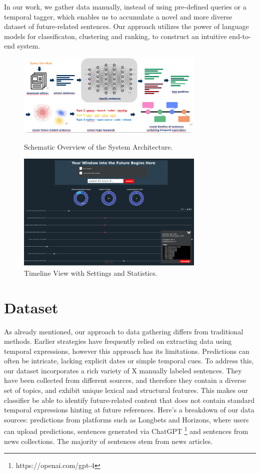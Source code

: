 \documentclass[10pt,twocolumn]{article}
\begin{document}
In our work, we gather data manually, instead of using pre-defined queries or a temporal tagger, which enables us to accumulate a novel and more diverse dataset of future-related sentences. Our approach utilizes the power of language models for classificaton, clustering and ranking, to construct an intuitive end-to-end system.

\begin{figure}[t]
\centering
\begin{minipage}{0.48\textwidth}
\centering
\includegraphics[width=9cm]{img/system.png}
\caption{Schematic Overview of the System Architecture.}
\label{fig:image1}
\end{minipage}
\hfill
\begin{minipage}{0.48\textwidth}
\centering
\includegraphics[width=9cm]{img/ui.png}
\caption{Timeline View with Settings and Statistics.}
\label{fig:image2}
\end{minipage}

\end{figure}

\section{Dataset}
As already mentioned, our approach to data gathering differs from traditional methods. Earlier strategies have frequently relied on extracting data using temporal expressions, however this approach has its limitations. Predictions can often be intricate, lacking explicit dates or simple temporal cues.
To address this, our dataset incorporates a rich variety of X manually labeled sentences. They have been collected from different sources, and therefore they contain a diverse set of topics, and exhibit unique lexical and structural features. This makes our classifier be able to identify future-related content that does not contain standard temporal expressions hinting at future references.
Here's a breakdown of our data sources: predictions from platforms such as Longbets and Horizons, where users can upload predictions, sentences generated via ChatGPT \footnote{https://openai.com/gpt-4} and sentences from news collections. The majority of sentences stem from news articles.
\end{document}
